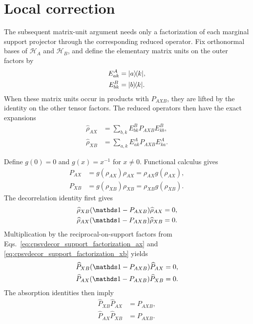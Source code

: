 \documentclass{article}
\begin{document}
\section{Local correction}

The subsequent matrix-unit argument needs only a factorization of each
marginal support projector through the corresponding reduced operator. Fix
orthonormal bases of $\mathcal H_A$ and $\mathcal H_B$, and define the
elementary matrix units on the outer factors by
\begin{align}
    E^A_{ak}
        &= |a\rangle\!\langle k|,
    \label{eq:cpsvdecor_matrix_unit_a}\\
    E^B_{bk}
        &= |b\rangle\!\langle k|.
    \label{eq:cpsvdecor_matrix_unit_b}
\end{align}
When these matrix units occur in products with $P_{AXB}$, they are lifted by
the identity on the other tensor factors. The reduced operators then have the
exact expansions
\begin{align}
    \widehat\rho_{AX}
        &= \sum_{b,k} E^B_{bk}P_{AXB}E^B_{kb},
    \label{eq:cpsvdecor_reduced_expansion_ax}\\
    \widehat\rho_{XB}
        &= \sum_{a,k} E^A_{ak}P_{AXB}E^A_{ka}.
    \label{eq:cpsvdecor_reduced_expansion_xb}
\end{align}

Define $g(0)=0$ and $g(x)=x^{-1}$ for $x\neq 0$. Functional calculus gives
\begin{align}
    P_{AX}
        &= g(\rho_{AX})\rho_{AX}
         = \rho_{AX}g(\rho_{AX}),
    \label{eq:cpsvdecor_support_factorization_ax}\\
    P_{XB}
        &= g(\rho_{XB})\rho_{XB}
         = \rho_{XB}g(\rho_{XB}).
    \label{eq:cpsvdecor_support_factorization_xb}
\end{align}
The decorrelation identity first gives
\begin{align}
    \widehat\rho_{XB}(\Id-P_{AXB})\widehat\rho_{AX}
        &= 0,
    \label{eq:cpsvdecor_reduced_complement_product_xbax}\\
    \widehat\rho_{AX}(\Id-P_{AXB})\widehat\rho_{XB}
        &= 0.
    \label{eq:cpsvdecor_reduced_complement_product_axxb}
\end{align}
Multiplication by the reciprocal-on-support factors from
Eqs.~\ref{eq:cpsvdecor_support_factorization_ax} and
\ref{eq:cpsvdecor_support_factorization_xb} yields
\begin{align}
    \widehat P_{XB}(\Id-P_{AXB})\widehat P_{AX}
        &= 0,
    \label{eq:cpsvdecor_support_complement_product_xbax}\\
    \widehat P_{AX}(\Id-P_{AXB})\widehat P_{XB}
        &= 0.
    \label{eq:cpsvdecor_support_complement_product_axxb}
\end{align}
The absorption identities then imply
\begin{align}
    \widehat P_{XB}\widehat P_{AX}
        &= P_{AXB},
    \label{eq:cpsvdecor_support_product_xbax}\\
    \widehat P_{AX}\widehat P_{XB}
        &= P_{AXB}.
    \label{eq:cpsvdecor_support_product_axxb}
\end{align}
\end{document}
